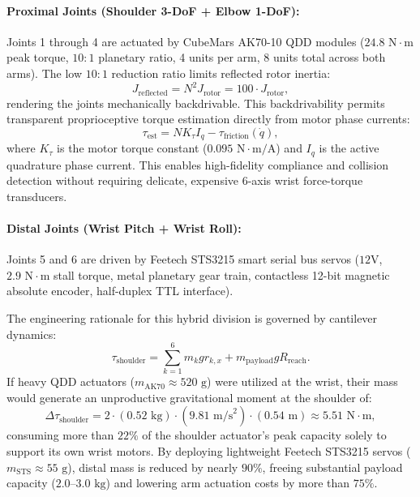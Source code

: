 \paragraph{Proximal Joints (Shoulder 3-DoF + Elbow 1-DoF):}
Joints 1 through 4 are actuated by CubeMars AK70-10 QDD modules ($24.8\text{ N}\cdot\text{m}$ peak torque, $10:1$ planetary ratio, 4 units per arm, 8 units total across both arms). The low $10:1$ reduction ratio limits reflected rotor inertia:
\begin{equation}
  J_{\text{reflected}} = N^2 J_{\text{rotor}} = 100 \cdot J_{\text{rotor}},
\end{equation}
rendering the joints mechanically backdrivable. This backdrivability permits transparent proprioceptive torque estimation directly from motor phase currents:
\begin{equation}
  \tau_{\text{est}} = N K_\tau I_q - \tau_{\text{friction}}(\dot{q}),
  \label{eq:proprioceptive_torque}
\end{equation}
where $K_\tau$ is the motor torque constant ($0.095\text{ N}\cdot\text{m/A}$) and $I_q$ is the active quadrature phase current. This enables high-fidelity compliance and collision detection without requiring delicate, expensive 6-axis wrist force-torque transducers.

\paragraph{Distal Joints (Wrist Pitch + Wrist Roll):}
Joints 5 and 6 are driven by Feetech STS3215 smart serial bus servos ($12\text{V}$, $2.9\text{ N}\cdot\text{m}$ stall torque, metal planetary gear train, contactless 12-bit magnetic absolute encoder, half-duplex TTL interface). 

The engineering rationale for this hybrid division is governed by cantilever dynamics:
\begin{equation}
  \tau_{\text{shoulder}} = \sum_{k=1}^{6} m_k g r_{k,x} + m_{\text{payload}} g R_{\text{reach}}.
\end{equation}
If heavy QDD actuators ($m_{\text{AK70}} \approx 520\text{ g}$) were utilized at the wrist, their mass would generate an unproductive gravitational moment at the shoulder of:
\begin{equation}
  \Delta \tau_{\text{shoulder}} = 2 \cdot (0.52\text{ kg}) \cdot (9.81\text{ m/s}^2) \cdot (0.54\text{ m}) \approx 5.51\text{ N}\cdot\text{m},
\end{equation}
consuming more than $22\%$ of the shoulder actuator's peak capacity solely to support its own wrist motors. By deploying lightweight Feetech STS3215 servos ($m_{\text{STS}} \approx 55\text{ g}$), distal mass is reduced by nearly $90\%$, freeing substantial payload capacity ($2.0\text{--}3.0\text{ kg}$) and lowering arm actuation costs by more than $75\%$.

